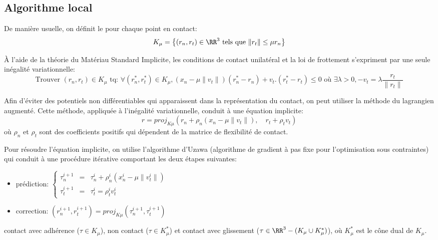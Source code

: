 \medskip
\subsection{Algorithme local}

De manière usuelle, on définit le  pour chaque point 
en contact:
\begin{equation} K_\mu = \left\{ (r_n, r_t) \in \RR^3 \text{ tels que } \|r_t\| \le \mu r_n \right\} \end{equation}

À l'aide de la théorie du Matériau Standard Implicite, les conditions de contact unilatéral et la 
loi de frottement s'expriment par une seule inégalité variationnelle:
\begin{equation} \text{Trouver } (r_n, r_t) \in K_\mu \text{ tq: }
\forall (r_n^*, r_t^*) \in K_\mu, (x_n - \mu \|v_t\|) (r_n^* - r_n) + v_t.(r_t^* - r_t) \le 0
\text{ où } \exists\lambda>0, - v_t = \lambda \frac{r_t}{\|r_t\|} \end{equation}

\medskip
Afin d'éviter des potentiels non différentiables qui apparaissent dans la représentation du contact, 
on peut utiliser la méthode du lagrangien augmenté. 
Cette méthode, appliquée à l'inégalité variationnelle, conduit à une équation implicite:
\begin{equation} r = proj_{K\mu} (r_n + \rho_n(x_n - \mu \|v_t\|), \quad r_t + \rho_t v_t) \end{equation}
où $\rho_n$ et $\rho_t$ sont des coefficients positifs qui dépendent de la matrice de flexibilité 
de contact.

Pour résoudre l'équation implicite, on utilise l'algorithme d'Uzawa 
(algorithme de gradient à pas fixe pour l'optimisation sous contraintes) qui conduit à une procédure 
itérative comportant les deux étapes suivantes:
\begin{itemize}
   \item prédiction: $\left\{\begin{array}{lrl} 
	\tau_n^{i+1}&=&\tau_n^i+\rho_n^i(x_n^i-\mu\|v_t^i\|)\\
	\tau_t^{i+1}&=&\tau_t^i=\rho_t^iv_t^i
	\end{array}\right.$
   \item correction: $(r_n^{i+1},r_t^{i+1}) = proj_{K\mu}(\tau_ n^{i+1}, \tau_t^{i+1})$
\end{itemize}
contact avec adhérence ($\tau\in K_\mu$), non contact ($\tau\in K_\mu^*$) et contact avec 
glissement ($\tau\in\RR^3- (K_\mu \cup K_\mu^*)$), où $K_\mu^*$ est le cône dual de $K_\mu$.

